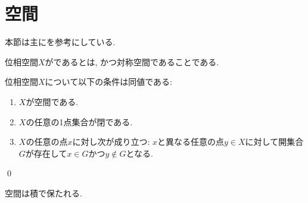 \documentclass[uplatex, dvipdfmx, a4paper, 12pt, class=jsbook, crop=false]{standalone}
\begin{document}
\section{空間}
\label{sec:T1-spaces}

\begin{source}
	本節は主に\cite[Chapter 16]{Schechter1997HAF}を参考にしている.
\end{source}

\begin{definition}
	位相空間$ X $がであるとは, かつ対称空間であることである.
\end{definition}

\begin{proposition}
	\label{T100001}
	位相空間$ X $について以下の条件は同値である:
	\begin{enumerate}
		\item $ X $が空間である.
		\item $ X $の任意の1点集合が閉である.
		\item $ X $の任意の点$ x $に対し次が成り立つ: $ x $と異なる任意の点$ y \in X $に対して開集合$ G $が存在して$ x \in G $かつ$ y \not\in G $となる.
	\end{enumerate}
	\qed
\end{proposition}

\begin{proposition}
	\label{T100002}
	空間は積で保たれる.
\end{proposition}
\end{document}
